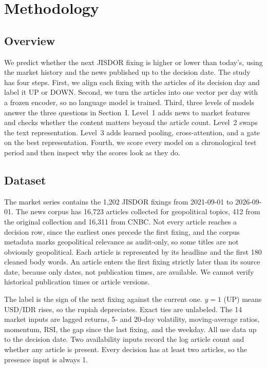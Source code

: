 \section{Methodology}
\label{sec:methodology}
\subsection{Overview}
We predict whether the next JISDOR fixing is higher or lower than today's, using the market history and the news published up to the decision date. The study has four steps. First, we align each fixing with the articles of its decision day and label it UP or DOWN. Second, we turn the articles into one vector per day with a frozen encoder, so no language model is trained. Third, three levels of models answer the three questions in Section~I. Level~1 adds news to market features and checks whether the content matters beyond the article count. Level~2 swaps the text representation. Level~3 adds learned pooling, cross-attention, and a gate on the best representation. Fourth, we score every model on a chronological test period and then inspect why the scores look as they do.

\subsection{Dataset}
The market series contains the 1{,}202 JISDOR fixings from 2021-09-01 to 2026-09-01. The news corpus has 16{,}723 articles collected for geopolitical topics, 412 from the original collection and 16{,}311 from CNBC. Not every article reaches a decision row, since the earliest ones precede the first fixing, and the corpus metadata marks geopolitical relevance as audit-only, so some titles are not obviously geopolitical. Each article is represented by its headline and the first 180 cleaned body words. An article enters the first fixing strictly later than its source date, because only dates, not publication times, are available. We cannot verify historical publication times or article versions.

The label is the sign of the next fixing against the current one. $y=1$ (UP) means USD/IDR rises, so the rupiah depreciates. Exact ties are unlabeled. The 14 market inputs are lagged returns, 5- and 20-day volatility, moving-average ratios, momentum, RSI, the gap since the last fixing, and the weekday. All use data up to the decision date. Two availability inputs record the log article count and whether any article is present. Every decision has at least two articles, so the presence input is always 1.

